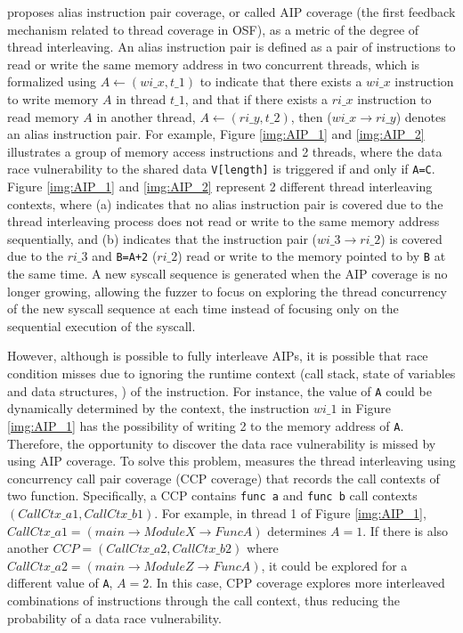 \cite{xu2020krace} proposes alias instruction pair coverage, or called AIP coverage (the first feedback mechanism related to thread coverage in OSF), as a metric of the degree of thread interleaving. An alias instruction pair is defined as a pair of instructions to read or write the same memory address in two concurrent threads, which is formalized using $A\leftarrow(wi\_x,t\_1)$ to indicate that there exists a $wi\_x$ instruction to write memory $A$ in thread $t\_1$, and that if there exists a $ri\_x$ instruction to read memory $A$ in another thread, \ie $A\leftarrow(ri\_y,t\_2)$, then ($wi\_x \rightarrow ri\_y$) denotes an alias instruction pair. For example, Figure \ref{img:AIP_1} and \ref{img:AIP_2} illustrates a group of memory access instructions and 2 threads, where the data race vulnerability to the shared data \texttt{V[length]} is triggered if and only if \texttt{A=C}. Figure \ref{img:AIP_1} and \ref{img:AIP_2} represent 2 different thread interleaving contexts, where (a) indicates that no alias instruction pair is covered due to the thread interleaving process does not read or write to the same memory address sequentially, and (b) indicates that the instruction pair ($wi\_3 \rightarrow ri\_2$) is covered due to the $ri\_3$ and \texttt{B=A+2} ($ri\_2$) read or write to the memory pointed to by \texttt{B} at the same time. A new syscall sequence is generated when the AIP coverage is no longer growing, allowing the fuzzer to focus on exploring the thread concurrency of the new syscall sequence at each time instead of focusing only on the sequential execution of the syscall.

However, although \cite{xu2020krace} is possible to fully interleave AIPs, it is possible that race condition misses due to ignoring the runtime context (\eg call stack, state of variables and data structures, \etc) of the instruction. For instance, the value of \texttt{A} could be dynamically determined by the context, \ie the instruction $wi\_1$ in Figure \ref{img:AIP_1} has the possibility of writing 2 to the memory address of \texttt{A}. Therefore, the opportunity to discover the data race vulnerability is missed by using AIP coverage. To solve this problem, \cite{CONZZER2022context} measures the thread interleaving using concurrency call pair coverage (CCP coverage) that records the call contexts of two function. Specifically, a CCP contains \texttt{func a} and \texttt{func b} call contexts $(CallCtx\_a1, CallCtx\_b1)$. For example, in thread 1 of Figure \ref{img:AIP_1}, $CallCtx\_a1 = (main \rightarrow ModuleX \rightarrow FuncA)$ determines $A =1$. If there is also another $CCP=(CallCtx\_a2, CallCtx\_b2)$ where $CallCtx\_a2 = (main \rightarrow ModuleZ \rightarrow FuncA)$, it could be explored for a different value of \texttt{A}, \eg $A=2$. In this case, CPP coverage explores more interleaved combinations of instructions through the call context, thus reducing the probability of a data race vulnerability.


